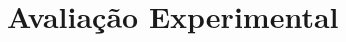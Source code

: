 \chapter[Avaliação Experimental]{Avaliação Experimental}
\label{chap:experimentos}

\lipsum[4 - 10]
